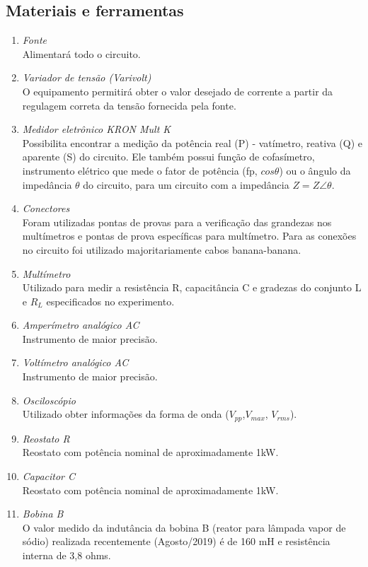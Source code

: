 \documentclass[a4paper,12pt,oneside,openany,table,xcdraw]{article}
\begin{document}
\subsection{Materiais e ferramentas} %
\begin{enumerate}[1 - ]
\item \emph{Fonte}\\
Alimentará todo o circuito.

\item \emph{Variador de tensão (Varivolt)}\\
O equipamento permitirá obter o valor desejado de corrente a partir da regulagem correta da tensão fornecida pela fonte.

\item \emph{Medidor eletrônico KRON Mult K}\\
Possibilita encontrar a medição da potência
real (P) - vatímetro, reativa (Q) e aparente (S) do circuito. Ele também possui função de cofasímetro, instrumento elétrico que mede o fator de potência (fp, $cos\theta$) ou o ângulo da impedância $\theta$ do circuito, para um circuito com a impedância $Z = Z\angle \theta$.

\item \emph{Conectores}\\
Foram utilizadas pontas de provas para a verificação das grandezas nos multímetros e pontas de prova específicas para multímetro. Para as conexões no circuito foi utilizado majoritariamente cabos banana-banana.

\item \emph{Multímetro}\\
Utilizado para medir a resistência R, capacitância C e gradezas do conjunto L e $R_L$ especificados no experimento.

\item \emph{Amperímetro analógico AC}\\
Instrumento de maior precisão.

\item \emph{Voltímetro analógico AC}\\
Instrumento de maior precisão.

\item \emph{Osciloscópio}\\
Utilizado obter informações da forma de onda ($V_{pp}$,$V_{max}$, $V_{rms}$).

\item \emph{Reostato R}\\
Reostato com potência nominal de aproximadamente 1kW.

\item \emph{Capacitor C}\\
Reostato com potência nominal de aproximadamente 1kW.

\item \emph{Bobina B}\\
O valor medido da indutância da bobina B (reator para lâmpada vapor de sódio) realizada
recentemente (Agosto/2019) é de 160 mH e resistência interna de 3,8 ohms.

\end{enumerate}
\end{document}

